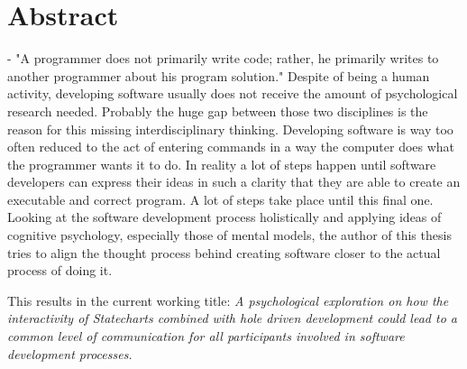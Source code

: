\chapter{Abstract}
- "A programmer does not primarily write code; rather, he primarily writes to another programmer about his program solution." \autocite{noauthor_what_1967}
Despite of being a human activity, developing software usually does not receive the amount of psychological research needed. Probably the huge gap between those two disciplines is the reason for this missing interdisciplinary thinking. Developing software is way too often reduced to the act of entering commands in a way the computer does what the programmer wants it to do. In reality a lot of steps happen until software developers can express their ideas in such a clarity that they are able to create an executable and correct program. A lot of steps take place until this final one. Looking at the software development process holistically and applying ideas of cognitive psychology, especially those of mental models, the author of this thesis tries to align the thought process behind creating software closer to the actual process of doing it.

This results in the current working title: \emph{A psychological exploration on how the interactivity of Statecharts combined with hole driven development could lead to a common level of communication for all participants involved in software development processes.}